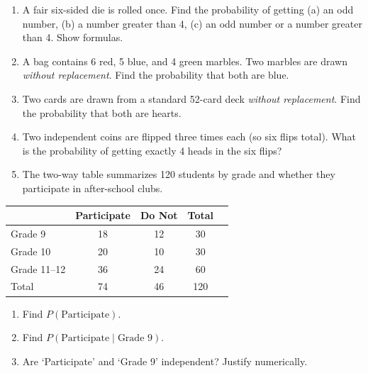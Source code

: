 \documentclass[11pt]{article}
\begin{document}
\begin{enumerate}
\item A fair six-sided die is rolled once. Find the probability of getting (a) an odd number, (b) a number greater than 4, (c) an odd number or a number greater than 4. Show formulas.

\item A bag contains 6 red, 5 blue, and 4 green marbles. Two marbles are drawn \emph{without replacement}. Find the probability that both are blue.

\item Two cards are drawn from a standard 52-card deck \emph{without replacement}. Find the probability that both are hearts.

\item Two independent coins are flipped three times each (so six flips total). What is the probability of getting exactly 4 heads in the six flips?

\item The two-way table summarizes 120 students by grade and whether they participate in after-school clubs.
\end{enumerate}

\begin{center}
\begin{tabular}{l|ccc|c}
 & Participate & Do Not & Total \\\hline
Grade 9 & 18 & 12 & 30\\
Grade 10 & 20 & 10 & 30\\
Grade 11--12 & 36 & 24 & 60\\\hline
Total & 74 & 46 & 120
\end{tabular}
\end{center}
\begin{enumerate}
\item Find $P(\text{Participate})$.
\item Find $P(\text{Participate}\mid \text{Grade 9})$.
\item Are `Participate' and `Grade 9' independent? Justify numerically.
\end{enumerate}
\end{document}

